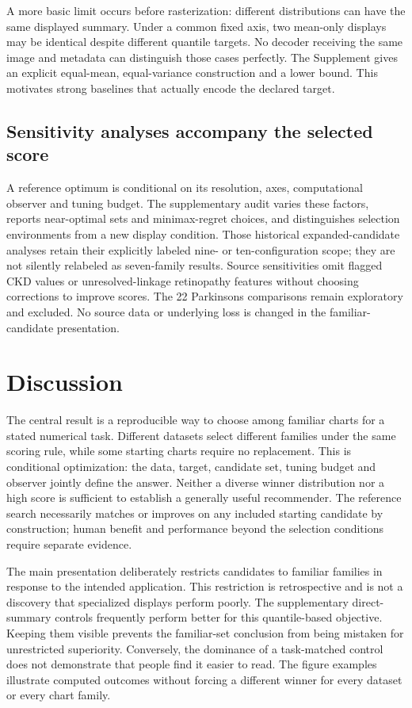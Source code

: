 \documentclass[11pt]{article}
\begin{document}
A more basic limit occurs before rasterization: different distributions can have the same displayed summary. Under a common fixed axis, two mean-only displays may be identical despite different quantile targets. No decoder receiving the same image and metadata can distinguish those cases perfectly. The Supplement gives an explicit equal-mean, equal-variance construction and a lower bound. This motivates strong baselines that actually encode the declared target.

\subsection*{Sensitivity analyses accompany the selected score}
A reference optimum is conditional on its resolution, axes, computational observer and tuning budget. The supplementary audit varies these factors, reports near-optimal sets and minimax-regret choices, and distinguishes selection environments from a new display condition. Those historical expanded-candidate analyses retain their explicitly labeled nine- or ten-configuration scope; they are not silently relabeled as seven-family results. Source sensitivities omit flagged CKD values or unresolved-linkage retinopathy features without choosing corrections to improve scores. The 22 Parkinsons comparisons remain exploratory and excluded. No source data or underlying loss is changed in the familiar-candidate presentation.

\section*{Discussion}
The central result is a reproducible way to choose among familiar charts for a stated numerical task. Different datasets select different families under the same scoring rule, while some starting charts require no replacement. This is conditional optimization: the data, target, candidate set, tuning budget and observer jointly define the answer. Neither a diverse winner distribution nor a high score is sufficient to establish a generally useful recommender. The reference search necessarily matches or improves on any included starting candidate by construction; human benefit and performance beyond the selection conditions require separate evidence.

The main presentation deliberately restricts candidates to familiar families in response to the intended application. This restriction is retrospective and is not a discovery that specialized displays perform poorly. The supplementary direct-summary controls frequently perform better for this quantile-based objective. Keeping them visible prevents the familiar-set conclusion from being mistaken for unrestricted superiority. Conversely, the dominance of a task-matched control does not demonstrate that people find it easier to read. The figure examples illustrate computed outcomes without forcing a different winner for every dataset or every chart family.
\end{document}
